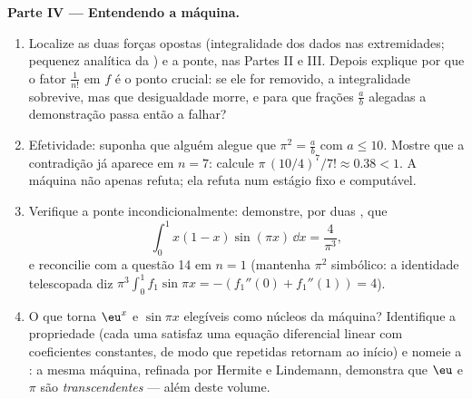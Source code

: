 \begin{problem}
\medskip
\noindent\textbf{Parte IV --- Entendendo a máquina.}
\begin{enumerate}
  \item Localize as duas forças opostas (integralidade dos dados nas
        extremidades; pequenez analítica da ) e a
        ponte, nas Partes II e III. Depois explique por que o fator
        $\frac{1}{n!}$ em $f$ é o ponto crucial: se ele for removido,
        a integralidade sobrevive, mas que desigualdade morre, e para
        que frações $\frac ab$ alegadas a demonstração passa então a
        falhar?
  \item Efetividade: suponha que alguém alegue que $\pi^2 = \frac ab$
        com $a \leq 10$. Mostre que a contradição já
        aparece em $n = 7$: calcule $\pi\,(10/4)^7/7! \approx
        0.38 < 1$. A máquina não apenas
        refuta; ela refuta num estágio fixo e computável.
  \item Verifique a ponte incondicionalmente: demonstre, por duas
        , que
        \[
        \int_0^1 x(1 - x)\sin(\pi x)\,\dd x = \frac{4}{\pi^3},
        \]
        e reconcilie com a questão 14 em $n = 1$ (mantenha
        $\pi^2$ simbólico: a identidade telescopada diz $\pi^3
        \int_0^1 f_1 \sin \pi x = -(f_1''(0) + f_1''(1)) = 4$).
  \item O que torna $\eu^x$ e $\sin \pi x$ elegíveis como
        núcleos da máquina? Identifique a propriedade (cada uma satisfaz
        uma equação diferencial linear com coeficientes
        constantes, de modo que  repetidas
        retornam ao início) e nomeie a : a mesma
        máquina, refinada por Hermite e Lindemann, demonstra que $\eu$
        e $\pi$ são \emph{transcendentes} --- além deste volume.
\end{enumerate}


\end{problem}
